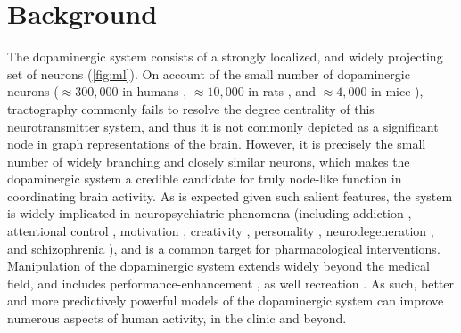 \section{Background}


The dopaminergic system consists of a strongly localized, and widely projecting set of neurons (\cref{fig:ml}).
On account of the small number of dopaminergic neurons ($\approx300,000$ in humans \cite{rice2016}, $\approx10,000$ in rats \cite{german1993}, and $\approx4,000$ in mice \cite{triarhou1988}), tractography commonly fails to resolve the degree centrality of this neurotransmitter system, and thus it is not commonly depicted as a significant node in graph representations of the brain.
However, it is precisely the small number of widely branching and closely similar neurons, which makes the dopaminergic system a credible candidate for truly node-like function in coordinating brain activity.
As is expected given such salient features, the system is widely implicated in neuropsychiatric phenomena (including
addiction \cite{DiChiara1988,DiChiara1999},
attentional control \cite{Nieoullon2002},
motivation \cite{Salamone1994},
creativity \cite{Chermahini2010},
personality \cite{Depue1999},
neurodegeneration \cite{Masliah2000},
and schizophrenia \cite{Howes2009}),
and is a common target for pharmacological interventions.
Manipulation of the dopaminergic system extends widely beyond the medical field, and includes performance-enhancement \cite{Mehta2000,Turner2003}, as well recreation \cite{DiChiara1988}.
As such, better and more predictively powerful models of the dopaminergic system can improve numerous aspects of human activity, in the clinic and beyond.


